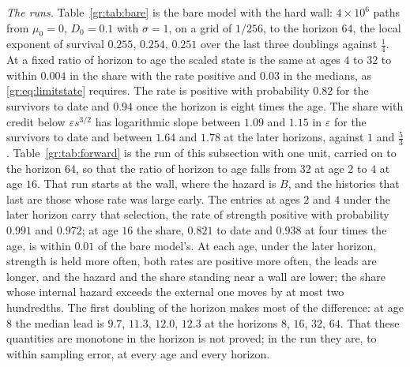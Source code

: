\emph{The runs.} Table~\ref{gr:tab:bare} is the bare model with the hard
wall: $4\times10^6$ paths from $\mu_0=0$, $D_0=0.1$ with $\sigma=1$, on a
grid of $1/256$, to the horizon $64$, the local exponent of survival
$0.255$, $0.254$, $0.251$ over the last three doublings
against $\tfrac14$. At a fixed ratio of horizon to age the scaled state
is the same at ages $4$ to $32$ to within $0.004$ in the share
with the rate positive and $0.03$ in the medians, as
\eqref{gr:eq:limitstate} requires. The rate is positive with probability
$0.82$ for the survivors to date and $0.94$ once the horizon is
eight times the age. The share with credit below $\varepsilon s^{3/2}$
has logarithmic slope between $1.09$ and $1.15$ in
$\varepsilon$ for the survivors to date and between $1.64$ and
$1.78$ at the later horizons, against $1$ and $\tfrac53$.
Table~\ref{gr:tab:forward} is the run of this subsection with one unit, carried on to
the horizon $64$, so that the ratio of horizon to age falls from $32$ at
age $2$ to $4$ at age $16$. That run starts at the wall,
where the hazard is $B$, and the histories that last are those whose rate
was large early. The entries at ages $2$ and $4$ under the later horizon
carry that selection, the rate of strength positive with probability
$0.991$ and $0.972$; at age $16$ the share, $0.821$ to date
and $0.938$ at four times the age, is within $0.01$ of the bare
model's. At each age, under the later horizon, strength is held more
often, both rates are positive more often, the leads are longer, and the hazard
and the share standing near a wall are lower; the share whose internal
hazard exceeds the external one moves by at most two hundredths. The
first doubling of the horizon makes most of the difference: at age $8$
the median lead is $9.7$, $11.3$, $12.0$, $12.3$ at
the horizons $8$, $16$, $32$, $64$. That these quantities are monotone
in the horizon is not proved; in the run they are, to within sampling
error, at every age and every horizon.

